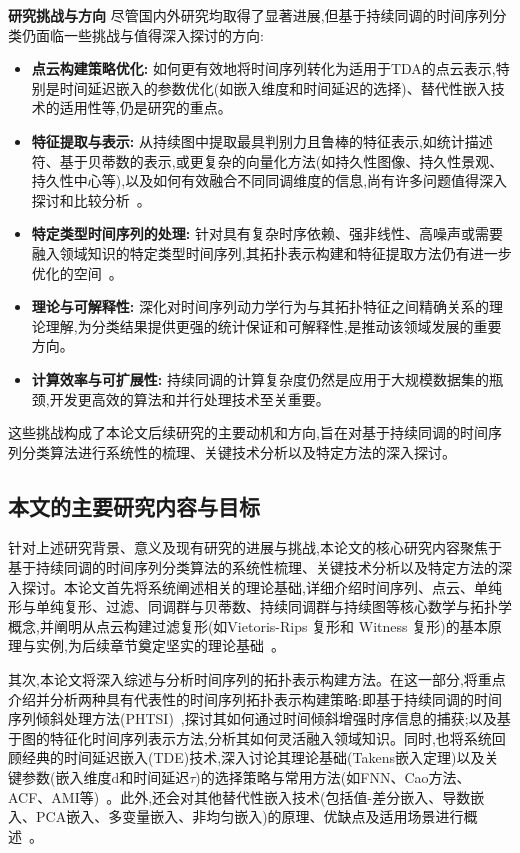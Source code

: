\textbf{研究挑战与方向}
尽管国内外研究均取得了显著进展,但基于持续同调的时间序列分类仍面临一些挑战与值得深入探讨的方向:
\begin{itemize}
    \item \textbf{点云构建策略优化:} 如何更有效地将时间序列转化为适用于TDA的点云表示,特别是时间延迟嵌入的参数优化(如嵌入维度和时间延迟的选择)、替代性嵌入技术的适用性等,仍是研究的重点。
    \item \textbf{特征提取与表示:} 从持续图中提取最具判别力且鲁棒的特征表示,如统计描述符、基于贝蒂数的表示,或更复杂的向量化方法(如持久性图像、持久性景观、持久性中心等),以及如何有效融合不同同调维度的信息,尚有许多问题值得深入探讨和比较分析~。
    \item \textbf{特定类型时间序列的处理:} 针对具有复杂时序依赖、强非线性、高噪声或需要融入领域知识的特定类型时间序列,其拓扑表示构建和特征提取方法仍有进一步优化的空间~。
    \item \textbf{理论与可解释性:} 深化对时间序列动力学行为与其拓扑特征之间精确关系的理论理解,为分类结果提供更强的统计保证和可解释性,是推动该领域发展的重要方向。
    \item \textbf{计算效率与可扩展性:} 持续同调的计算复杂度仍然是应用于大规模数据集的瓶颈,开发更高效的算法和并行处理技术至关重要。
\end{itemize}
这些挑战构成了本论文后续研究的主要动机和方向,旨在对基于持续同调的时间序列分类算法进行系统性的梳理、关键技术分析以及特定方法的深入探讨。

\subsection{本文的主要研究内容与目标}
针对上述研究背景、意义及现有研究的进展与挑战,本论文的核心研究内容聚焦于基于持续同调的时间序列分类算法的系统性梳理、关键技术分析以及特定方法的深入探讨。本论文首先将系统阐述相关的理论基础,详细介绍时间序列、点云、单纯形与单纯复形、过滤、同调群与贝蒂数、持续同调群与持续图等核心数学与拓扑学概念,并阐明从点云构建过滤复形(如Vietoris-Rips 复形和 Witness 复形)的基本原理与实例,为后续章节奠定坚实的理论基础~。

其次,本论文将深入综述与分析时间序列的拓扑表示构建方法。在这一部分,将重点介绍并分析两种具有代表性的时间序列拓扑表示构建策略:即基于持续同调的时间序列倾斜处理方法(PHTSI)~,探讨其如何通过时间倾斜增强时序信息的捕获;以及基于图的特征化时间序列表示方法,分析其如何灵活融入领域知识。同时,也将系统回顾经典的时间延迟嵌入(TDE)技术,深入讨论其理论基础(Takens嵌入定理)以及关键参数(嵌入维度d和时间延迟$\tau$)的选择策略与常用方法(如FNN、Cao方法、ACF、AMI等)~。此外,还会对其他替代性嵌入技术(包括值-差分嵌入、导数嵌入、PCA嵌入、多变量嵌入、非均匀嵌入)的原理、优缺点及适用场景进行概述~。

